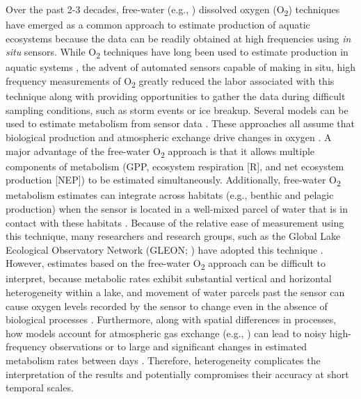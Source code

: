 \documentclass[12pt, oneside]{article}
\begin{document}
Over the past 2-3 decades, free-water (e.g., \citealt{Vachon_Sadro_2020}) dissolved oxygen (O\textsubscript{2}) techniques have emerged as a common approach to estimate production of aquatic ecosystems because the data can be readily obtained at high frequencies using \emph{in situ} sensors. While O\textsubscript{2} techniques have long been used to estimate production in aquatic systems \citep{Sargent_Austin_1949, Odum_1956,staehr_lake_2010}, the advent of automated sensors capable of making in situ, high frequency measurements of O\textsubscript{2} greatly reduced the labor associated with this technique along with providing opportunities to gather the data during difficult sampling conditions, such as storm events or ice breakup. Several models can be used to estimate metabolism from sensor data
\citep{Cole_Pace_Carpenter_Kitchell_2000, Hanson_Carpenter_Kimura_Wu_Cornelius_Kratz_2008, Holtgrieve_Arias_Irvine_Lamberts_Ward_Kummu_Koponen_Sarkkula_Richey_2013, Batt_Carpenter_2012, solomon_ecosystem_2013, phillips_timevarying_2020}. These approaches all assume that biological production and atmospheric exchange drive changes in oxygen \citep{Odum_1956}. A major advantage of the free-water O\textsubscript{2} approach is that it allows multiple components of metabolism (GPP, ecosystem respiration [R], and net ecosystem production [NEP]) to be estimated simultaneously. Additionally, free-water O\textsubscript{2} metabolism estimates can integrate across habitats (e.g., benthic and pelagic production) when the sensor is located in a well-mixed parcel of water that is in contact with these habitats \citep{VandeBogert_Carpenter_Cole_Pace_2007}. Because of the relative ease of measurement using this technique, many researchers and research groups, such as the Global Lake Ecological Observatory Network (GLEON; \citealt{Weathers_Hanson_2013}) have adopted this technique \citep{solomon_ecosystem_2013}. However, estimates based on the free-water O\textsubscript{2} approach can be difficult to interpret, because metabolic rates exhibit substantial vertical \citep{Staehr_Christensen_Batt_Read_2012} and horizontal \citep{VandeBogert_Bade_Carpenter_Cole_Pace_Hanson_Langman_2012} heterogeneity within a lake, and movement of water parcels past the sensor can cause oxygen levels recorded by the sensor to change even in the absence of biological processes \citep{Rose_Winslow_Read_Read_Solomon_Adrian_Hanson_2014}. Furthermore, along with spatial differences in processes, how models account for atmospheric gas exchange (e.g., \citealt{dugan_consequences_2016}) can lead to noisy high-frequency observations \citep{Batt_Carpenter_2012} or to large and significant changes in estimated metabolism rates between days \citep{solomon_ecosystem_2013}. Therefore, heterogeneity complicates the interpretation of the results and potentially compromises their accuracy at short temporal scales.
\end{document}
